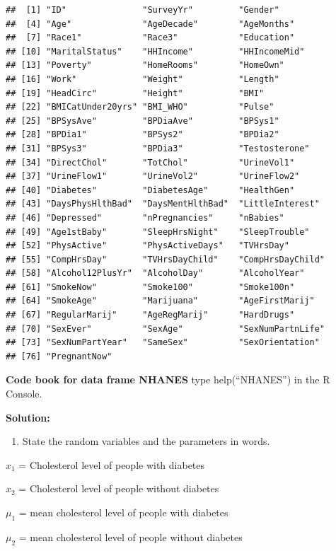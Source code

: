 \documentclass[]{book}
\providecommand{\tightlist}{%
  \setlength{\itemsep}{0pt}\setlength{\parskip}{0pt}}
\begin{document}
\begin{verbatim}
##  [1] "ID"               "SurveyYr"         "Gender"          
##  [4] "Age"              "AgeDecade"        "AgeMonths"       
##  [7] "Race1"            "Race3"            "Education"       
## [10] "MaritalStatus"    "HHIncome"         "HHIncomeMid"     
## [13] "Poverty"          "HomeRooms"        "HomeOwn"         
## [16] "Work"             "Weight"           "Length"          
## [19] "HeadCirc"         "Height"           "BMI"             
## [22] "BMICatUnder20yrs" "BMI_WHO"          "Pulse"           
## [25] "BPSysAve"         "BPDiaAve"         "BPSys1"          
## [28] "BPDia1"           "BPSys2"           "BPDia2"          
## [31] "BPSys3"           "BPDia3"           "Testosterone"    
## [34] "DirectChol"       "TotChol"          "UrineVol1"       
## [37] "UrineFlow1"       "UrineVol2"        "UrineFlow2"      
## [40] "Diabetes"         "DiabetesAge"      "HealthGen"       
## [43] "DaysPhysHlthBad"  "DaysMentHlthBad"  "LittleInterest"  
## [46] "Depressed"        "nPregnancies"     "nBabies"         
## [49] "Age1stBaby"       "SleepHrsNight"    "SleepTrouble"    
## [52] "PhysActive"       "PhysActiveDays"   "TVHrsDay"        
## [55] "CompHrsDay"       "TVHrsDayChild"    "CompHrsDayChild" 
## [58] "Alcohol12PlusYr"  "AlcoholDay"       "AlcoholYear"     
## [61] "SmokeNow"         "Smoke100"         "Smoke100n"       
## [64] "SmokeAge"         "Marijuana"        "AgeFirstMarij"   
## [67] "RegularMarij"     "AgeRegMarij"      "HardDrugs"       
## [70] "SexEver"          "SexAge"           "SexNumPartnLife" 
## [73] "SexNumPartYear"   "SameSex"          "SexOrientation"  
## [76] "PregnantNow"
\end{verbatim}

\textbf{Code book for data frame NHANES} type help(``NHANES'') in the R Console.

\textbf{Solution:}

\begin{enumerate}
\def\labelenumi{\arabic{enumi}.}
\tightlist
\item
  State the random variables and the parameters in words.
\end{enumerate}

\(x_1\) = Cholesterol level of people with diabetes

\(x_2\) = Cholesterol level of people without diabetes

\(\mu_1\) = mean cholesterol level of people with diabetes

\(\mu_2\) = mean cholesterol level of people without diabetes
\end{document}
